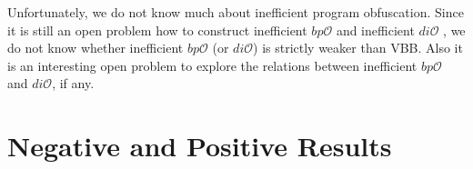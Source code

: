 \documentclass[12pt]{article}
\newcommand{\dio}{di\mathcal{O}}
\newcommand{\bpo}{bp\mathcal{O}}
\theoremstyle{definition}
\begin{document}
Unfortunately, we do not know much about inefficient program obfuscation. Since it is still an open problem how to construct inefficient $\bpo$ \cite{goldwasser2014best} and inefficient $\dio$ \cite{garg2014implausibility}, we do not know whether inefficient $\bpo$ (or $\dio$) is strictly weaker than VBB. Also it is an interesting open problem to explore the relations between inefficient $\bpo$ and $\dio$, if any.

\section{Negative and Positive Results}



	
\end{document}
